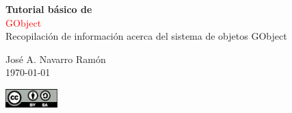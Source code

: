 %

\newcommand*{\titleTH}{\begingroup%
\raggedleft
\vspace*{\baselineskip}
{\bfseries Tutorial básico de}\\[\baselineskip]
{\textcolor{red}{\Huge GObject}}\\[\baselineskip]
{\small Recopilación de información acerca del sistema de objetos \textsf{GObject}}\par
\vspace{5ex}
\par
{\Large José A. Navarro Ramón}\\[0.167\textheight]
\today\par
\vspace{2ex}
{\Large \includegraphics[width=2.0cm]{./img/by-sa.eps}}\par
\vspace*{3\baselineskip}
\endgroup}

\titleTH


